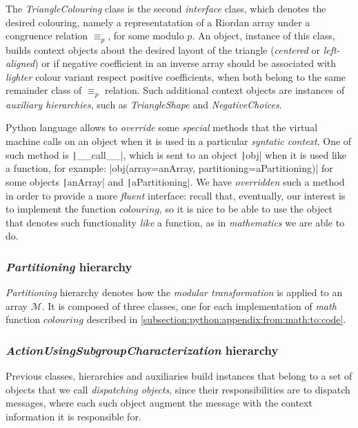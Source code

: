 The \emph{TriangleColouring} class is the second \emph{interface} class, which
denotes the desired colouring, namely a representatation of a Riordan array
under a congruence relation $\equiv_{p}$, for some modulo $p$. An object,
instance of this class, builds context objects about the desired layout of the
triangle (\emph{centered} or \emph{left-aligned}) or if negative coefficient in
an inverse array should be associated with \emph{lighter} colour variant
respect positive coefficients, when both belong to the same remainder class of
$\equiv_{p}$ relation. Such additional context objects are instances of
\emph{auxiliary hierarchies}, such as \emph{TriangleShape} and
\emph{NegativeChoices}.

Python language allows to \emph{override} some \emph{special} methods that the
virtual machine calls on an object when it is used in a particular
\emph{syntatic context}.  One of such method is \texttt|__call__|, which is sent
to an object \texttt|obj| when it is used like a function, for
example: |obj(array=anArray, partitioning=aPartitioning)| for some
objects \texttt|anArray| and \texttt|aPartitioning|. We
have \emph{overridden} such a method in order to provide a more \emph{fluent}
interface: recall that, eventually, our interest is to implement the function
$colouring$, so it is nice to be able to use the object that denotes such
functionality \emph{like} a function, as in \emph{mathematics} we are able to
do. 

\subsubsection{\emph{Partitioning} hierarchy}

\emph{Partitioning} hierarchy denotes how the \emph{modular transformation} is
applied to an array $\mathcal{M}$. It is composed of three classes, one for
each implementation of \emph{math} function $colouring$ described in
\autoref{subsection:python:appendix:from:math:to:code}.

\subsubsection{\emph{ActionUsingSubgroupCharacterization} hierarchy}

Previous classes, hierarchies and auxiliaries build instances that belong to a
set of objects that we call \emph{dispatching objects}, since their responsibilities
are to dispatch messages, where each such object augment the message with the
context information it is responsible for. 

